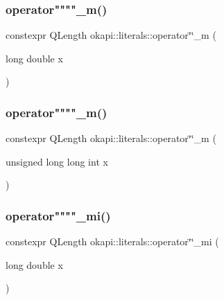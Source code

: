 \mbox{\label{namespaceokapi_1_1literals_ad860ceea3e6afea62c3cbf34cc423c6d}} 
\subsubsection{\texorpdfstring{operator""""\_m()}{operator""\_m()}\hspace{0.1cm}{\footnotesize\ttfamily [1/2]}}
{\footnotesize\ttfamily constexpr Q\+Length okapi\+::literals\+::operator\char`\"{}\char`\"{}\+\_\+m (\begin{DoxyParamCaption}\item[{long double}]{x }\end{DoxyParamCaption})}

\mbox{\label{namespaceokapi_1_1literals_ad7a8fb6325c0bdf2fb444cb95bb8f0a7}} 
\subsubsection{\texorpdfstring{operator""""\_m()}{operator""\_m()}\hspace{0.1cm}{\footnotesize\ttfamily [2/2]}}
{\footnotesize\ttfamily constexpr Q\+Length okapi\+::literals\+::operator\char`\"{}\char`\"{}\+\_\+m (\begin{DoxyParamCaption}\item[{unsigned long long int}]{x }\end{DoxyParamCaption})}

\mbox{\label{namespaceokapi_1_1literals_a726879fc529f4296a8b9e2a498f2cb7f}} 
\subsubsection{\texorpdfstring{operator""""\_mi()}{operator""\_mi()}\hspace{0.1cm}{\footnotesize\ttfamily [1/2]}}
{\footnotesize\ttfamily constexpr Q\+Length okapi\+::literals\+::operator\char`\"{}\char`\"{}\+\_\+mi (\begin{DoxyParamCaption}\item[{long double}]{x }\end{DoxyParamCaption})}

